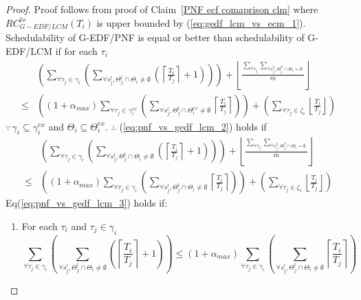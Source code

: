 \begin{proof}\normalfont
%
Proof follows from proof of Claim~\ref{PNF ecf comaprison clm} where $RC_{G-EDF/LCM}^{to}(T_i)$ is upper bounded by (\ref{eq:gedf_lcm_vs_ecm_1}). Schedulability of G-EDF/PNF is equal or better than schedulability of G-EDF/LCM if for each $\tau_i$ 
%
\begin{eqnarray}
 & \left(\sum_{\forall\tau_{j}\in\gamma_{i}}\left(\sum_{\forall s_{j}^{l},\Theta_{j}^{l}\cap\Theta_{i}\neq\emptyset}\left(\left\lceil \frac{T_{i}}{T_{j}}\right\rceil +1\right)\right)\right)+\left\lfloor \frac{\sum_{\forall\tau_{j}}\sum_{\forall s_{j}^{h},\Theta_{j}^{h}\cap\Theta_{i}=\emptyset}}{m}\right\rfloor \nonumber \\
\le & \left(\left(1+\alpha_{max}\right)\sum_{\forall\tau_{j}\in\gamma_{i}^{ex}}\left(\sum_{\forall s_{j}^{l},\Theta_{j}^{l}\cap\Theta_{i}^{ex}\neq\emptyset}\left\lceil \frac{T_{i}}{T_{j}}\right\rceil \right)\right)+\left(\sum_{\forall\tau_{j}\in\zeta_{i}}\left\lfloor \frac{T_{i}}{T_{j}}\right\rfloor \right)\label{eq:pnf_vs_gedf_lcm_2}
\end{eqnarray}
%
$\because\,\gamma_{i}\subseteq\gamma_{i}^{ex}$ and $\Theta_{i}\subseteq\Theta_{i}^{ex}$.
$\therefore$ (\ref{eq:pnf_vs_gedf_lcm_2}) holds if 
%
\begin{eqnarray}
 & \left(\sum_{\forall\tau_{j}\in\gamma_{i}}\left(\sum_{\forall s_{j}^{l},\Theta_{j}^{l}\cap\Theta_{i}\neq\emptyset}\left(\left\lceil \frac{T_{i}}{T_{j}}\right\rceil +1\right)\right)\right)+\left\lfloor \frac{\sum_{\forall\tau_{j}}\sum_{\forall s_{j}^{h},\Theta_{j}^{h}\cap\Theta_{i}=\emptyset}}{m}\right\rfloor \nonumber \\
\le & \left(\left(1+\alpha_{max}\right)\sum_{\forall\tau_{j}\in\gamma_{i}}\left(\sum_{\forall s_{j}^{l},\Theta_{j}^{l}\cap\Theta_{i}\neq\emptyset}\left\lceil \frac{T_{i}}{T_{j}}\right\rceil \right)\right)+\left(\sum_{\forall\tau_{j}\in\zeta_{i}}\left\lfloor \frac{T_{i}}{T_{j}}\right\rfloor \right)\label{eq:pnf_vs_gedf_lcm_3}
\end{eqnarray}
%
Eq(\ref{eq:pnf_vs_gedf_lcm_3}) holds if:
\begin{enumerate}
%
\item For each $\tau_{i}$ and $\tau_{j}\in\gamma_{i}$ 
\[
\sum_{\forall\tau_{j}\in\gamma_{i}}\left(\sum_{\forall s_{j}^{l},\Theta_{j}^{l}\cap\Theta_{i}\neq\emptyset}\left(\left\lceil \frac{T_{i}}{T_{j}}\right\rceil +1\right)\right)\le\left(1+\alpha_{max}\right)\sum_{\forall\tau_{j}\in\gamma_{i}}\left(\sum_{\forall s_{j}^{l},\Theta_{j}^{l}\cap\Theta_{i}\neq\emptyset}\left\lceil \frac{T_{i}}{T_{j}}\right\rceil \right)
\]
\end{enumerate}
\end{proof}
